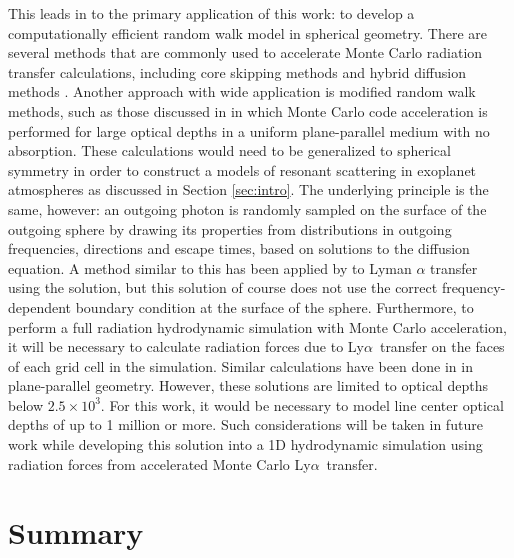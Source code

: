 \documentclass{aastex63}
\newcommand\lya{Ly$\alpha$\ }
\begin{document}
This leads in to the primary application of this work: to develop a computationally efficient random walk model in spherical geometry. There are several methods that are commonly used to accelerate Monte Carlo radiation transfer calculations, including core skipping methods \citep{1968ApJ...153..783A,2002ApJ...567..922A} and hybrid diffusion methods \citep{2018MNRAS.479.2065S}. Another approach with wide application is modified random walk methods, such as those discussed in \citet{2002ApJ...567..922A,2015MNRAS.449.4336S} in which Monte Carlo code acceleration is performed for large optical depths in a uniform plane-parallel medium with no absorption. These calculations would need to be generalized to spherical symmetry in order to construct a models of resonant scattering in exoplanet atmospheres as discussed in Section \ref{sec:intro}. The underlying principle is the same, however: an outgoing photon is randomly sampled on the surface of the outgoing sphere by drawing its properties from distributions in outgoing frequencies, directions and escape times, based on solutions to the diffusion equation. A method similar to this has been applied by \citet{2006ApJ...645..792T} to Lyman $\alpha$ transfer using the \cite{1990ApJ...350..216N} solution, but this solution of course does not use the correct frequency-dependent boundary condition at the surface of the sphere. Furthermore, to perform a full radiation hydrodynamic simulation with Monte Carlo acceleration, it will be necessary to calculate radiation forces due to \lya transfer on the faces of each grid cell in the simulation. Similar calculations have been done in \citet{1976ApJ...208..286W} in plane-parallel geometry. However, these solutions are limited to optical depths below $2.5 \times 10^3$. For this work, it would be necessary to model line center optical depths of up to 1 million or more. Such considerations will be taken in future work while developing this solution into a 1D hydrodynamic simulation using radiation forces from accelerated Monte Carlo \lya transfer.

\section{Summary}
\end{document}
